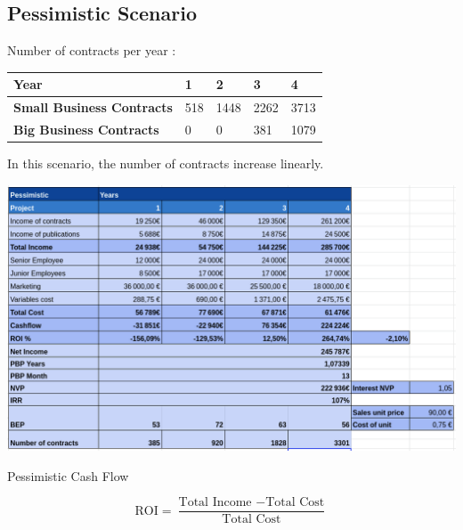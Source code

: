 \documentclass[./main.tex]{subfiles}
\begin{document}
\subsection{Pessimistic Scenario}
Number of contracts per year : 
\begin{table}[H]
	\centering
\begin{tabular}{|l|l|l|l|l|}
\hline
\textbf{Year}                     & 1  & 2   & 3   & 4   \\ \hline
\textbf{Small Business Contracts} & 518 & 1448 & 2262 & 3713 \\ \hline
\textbf{Big Business Contracts}   & 0  & 0   & 381  & 1079 \\ \hline
\end{tabular}
\end{table}
In this scenario, the number of contracts increase linearly.
\begin{table}[H]
	\centering
	\includegraphics[width=14cm]{img/pessimistic.png}
	\caption{Pessimistic Cash Flow}
	\label{tab:pessimistic}
\end{table}
\[
\textrm{ROI} = \frac{\textrm{Total Income }- \textrm{Total Cost}}{\textrm{Total Cost}}
\]
\end{document}
